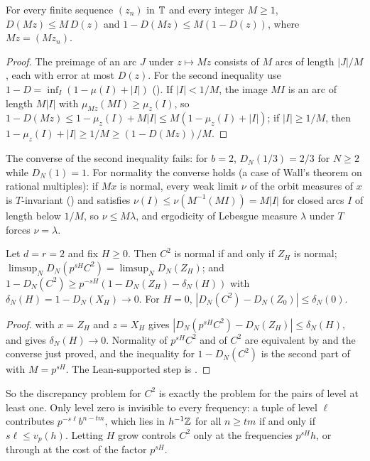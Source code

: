 \documentclass[11pt]{article}
\begin{document}
\begin{lemma}\label{lem:intmult}
For every finite sequence $(z_n)$ in $\mathbb T$ and every integer $M\ge1$, $D(Mz)\le M\,D(z)$ and
$1-D(Mz)\le M(1-D(z))$, where $Mz=(Mz_n)$.
\end{lemma}

\begin{proof}
The preimage of an arc $J$ under $z\mapsto Mz$ consists of $M$ arcs of length $|J|/M$, each with error at most
$D(z)$. For the second inequality use $1-D=\inf_I(1-\mu(I)+|I|)$ (). If $|I|<1/M$, the image $MI$
is an arc of length $M|I|$ with $\mu_{Mz}(MI)\ge\mu_z(I)$, so $1-D(Mz)\le1-\mu_z(I)+M|I|\le M(1-\mu_z(I)+|I|)$; if
$|I|\ge1/M$, then $1-\mu_z(I)+|I|\ge1/M\ge(1-D(Mz))/M$.
\end{proof}

The converse of the second inequality fails: for $b=2$, $D_N(1/3)=2/3$ for $N\ge2$ while $D_N(1)=1$. For
normality the converse holds (a case of Wall's theorem on rational multiples): if $Mx$ is normal, every
weak limit $\nu$ of the orbit measures of $x$ is $T$-invariant () and satisfies
$\nu(I)\le\nu(M^{-1}(MI))=M|I|$ for closed arcs $I$ of length below $1/M$, so $\nu\le M\lambda$, and ergodicity of
Lebesgue measure $\lambda$ under $T$ forces $\nu=\lambda$.

\begin{corollary}\label{cor:retire}
Let $d=r=2$ and fix $H\ge0$. Then $C^2$ is normal if and only if $Z_H$ is normal;
$\limsup_ND_N(p^{sH}C^2)=\limsup_ND_N(Z_H)$; and $1-D_N(C^2)\ge p^{-sH}(1-D_N(Z_H)-\delta_N(H))$ with
$\delta_N(H)=1-D_N(X_H)\to0$. For $H=0$, $|D_N(C^2)-D_N(Z_0)|\le\delta_N(0)$.
\end{corollary}

\begin{proof}
 with $x=Z_H$ and $z=X_H$ gives $|D_N(p^{sH}C^2)-D_N(Z_H)|\le\delta_N(H)$, and
 gives $\delta_N(H)\to0$. Normality of $p^{sH}C^2$ and of $C^2$ are equivalent by
 and the converse just proved, and the inequality for $1-D_N(C^2)$ is the second part of
 with $M=p^{sH}$. The Lean-supported step is .
\end{proof}

So the discrepancy problem for $C^2$ is exactly the problem for the pairs of level at least one. Only level
zero is invisible to every frequency: a tuple of level $\ell$ contributes $p^{-s\ell}b^{n-tm}$, which lies in
$h^{-1}\mathbb Z$ for all $n\ge tm$ if and only if $s\ell\le v_p(h)$. Letting $H$ grow controls $C^2$ only at the
frequencies $p^{sH}h$, or through  at the cost of the factor $p^{sH}$.
\end{document}
